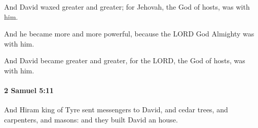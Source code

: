 			\begin{versebox}
					\item[BHS] 
					\item[ASV] And David waxed greater and greater; for Jehovah, the God of hosts, was with him.
					\item[NIV] And he became more and more powerful, because the LORD God Almighty was with him.
					\item[NRSV] And David became greater and greater, for the LORD, the God of hosts, was with him.
			\end{versebox}

		\paragraph{2 Samuel 5:11} %
			\label{2SAMUEL-5-11}

			And Hiram king of Tyre sent messengers to David, and cedar trees, and carpenters, and masons: and they built David an house.

